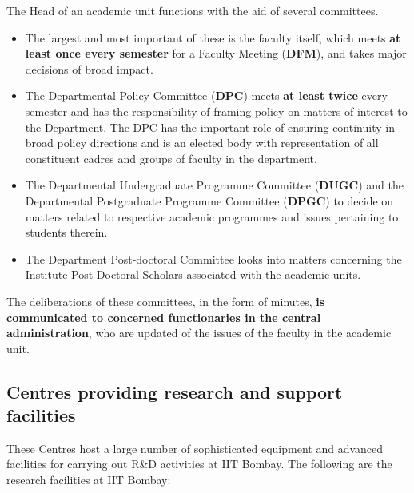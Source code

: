 \documentclass[
  10pt,
  a5paper,
  10pt,
  openany]{amsbook}
\providecommand{\tightlist}{%
  \setlength{\itemsep}{0pt}\setlength{\parskip}{0pt}}
\begin{document}
The Head of an academic unit functions with the aid of several
committees.

\begin{itemize}
\tightlist
\item
  The largest and most important of these is the faculty itself, which
  meets \textbf{at least once every semester} for a Faculty Meeting
  (\textbf{DFM}), and takes major decisions of broad impact.
\item
  The Departmental Policy Committee (\textbf{DPC}) meets \textbf{at
  least twice} every semester and has the responsibility of framing
  policy on matters of interest to the Department. The DPC has the
  important role of ensuring continuity in broad policy directions and
  is an elected body with representation of all constituent cadres and
  groups of faculty in the department.
\item
  The Departmental Undergraduate Programme Committee (\textbf{DUGC}) and
  the Departmental Postgraduate Programme Committee (\textbf{DPGC}) to
  decide on matters related to respective academic programmes and issues
  pertaining to students therein.
\item
  The Department Post-doctoral Committee looks into matters concerning
  the Institute Post-Doctoral Scholars associated with the academic
  units.
\end{itemize}

The deliberations of these committees, in the form of minutes,
\textbf{is communicated to concerned functionaries in the central
administration}, who are updated of the issues of the faculty in the
academic unit.

\subsection{Centres providing research and support
facilities}\label{centres-providing-research-and-support-facilities}

These Centres host a large number of sophisticated equipment and
advanced facilities for carrying out R\&D activities at IIT Bombay. The
following are the research facilities at IIT Bombay:
\end{document}
